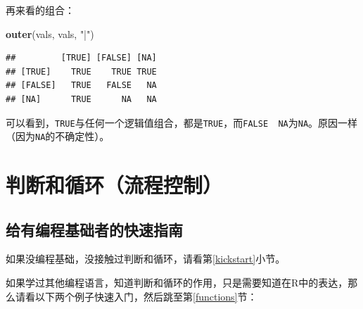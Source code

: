 \documentclass[]{book}
\newenvironment{Shaded}{\begin{snugshade}}{\end{snugshade}}
\newcommand{\CommentTok}[1]{\textcolor[rgb]{0.56,0.35,0.01}{\textit{#1}}}
\newcommand{\ControlFlowTok}[1]{\textcolor[rgb]{0.13,0.29,0.53}{\textbf{#1}}}
\newcommand{\DecValTok}[1]{\textcolor[rgb]{0.00,0.00,0.81}{#1}}
\newcommand{\KeywordTok}[1]{\textcolor[rgb]{0.13,0.29,0.53}{\textbf{#1}}}
\newcommand{\NormalTok}[1]{#1}
\newcommand{\OperatorTok}[1]{\textcolor[rgb]{0.81,0.36,0.00}{\textbf{#1}}}
\newcommand{\StringTok}[1]{\textcolor[rgb]{0.31,0.60,0.02}{#1}}
\begin{document}
再来看\texttt{\textbar{}}的组合：

\begin{Shaded}
\begin{Highlighting}[]
\KeywordTok{outer}\NormalTok{(vals, vals, }\StringTok{"|"}\NormalTok{)}
\end{Highlighting}
\end{Shaded}

\begin{verbatim}
##         [TRUE] [FALSE] [NA]
## [TRUE]    TRUE    TRUE TRUE
## [FALSE]   TRUE   FALSE   NA
## [NA]      TRUE      NA   NA
\end{verbatim}

可以看到，\texttt{TRUE}与任何一个逻辑值组合，都是\texttt{TRUE}，而\texttt{FALSE\ \textbar{}\ NA}为\texttt{NA}。原因一样（因为\texttt{NA}的不确定性）。

\hypertarget{control-flow}{%
\section{判断和循环（流程控制）}\label{control-flow}}

\subsection{给有编程基础者的快速指南}

如果没编程基础，没接触过判断和循环，请看第\ref{kickstart}小节。

如果学过其他编程语言，知道判断和循环的作用，只是需要知道在R中的表达，那么请看以下两个例子快速入门，然后跳至第\ref{functions}节：

\begin{Shaded}
\end{Shaded}
\end{document}
